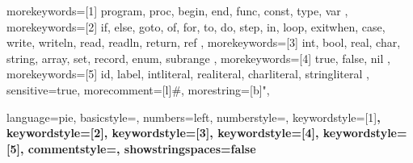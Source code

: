 {
    morekeywords={[1]
        program,
        proc,
        begin,
        end,
        func,
        const,
        type,
        var
    },
    morekeywords={[2]
        if,
        else,
        goto,
        of, %
        for,
        to, %
        do, %
        step, %
        in, %
        loop,
        exitwhen, %
        case,
        write,
        writeln,
        read,
        readln,
        return,
        ref
    },
    morekeywords={[3]
        int,
        bool,
        real,
        char,
        string,
        array,
        set,
        record,
        enum,
        subrange
    },
    morekeywords={[4]
        true, false, nil
    },
    morekeywords={[5]
        id,
        label,
        intliteral,
        realiteral,
        charliteral,
        stringliteral
    },
    sensitive=true,
    morecomment=[l]{\#},
    morestring=[b]",
}



{
    language=pie,
    basicstyle=\ttfamily,
    numbers=left,
    numberstyle=\tiny,
    keywordstyle=[1]\bfseries\color{keywordcolor},
    keywordstyle=[2]\bfseries\color{keywordcolor},
    keywordstyle=[3]\bfseries\color{keywordcolor},
    keywordstyle=[4]\bfseries\color{literalcolor},
    keywordstyle=[5]\bfseries\color{todefine},
    commentstyle=\color{commentcolor},
    showstringspaces=false
}

\lstset{style=pie}

%
